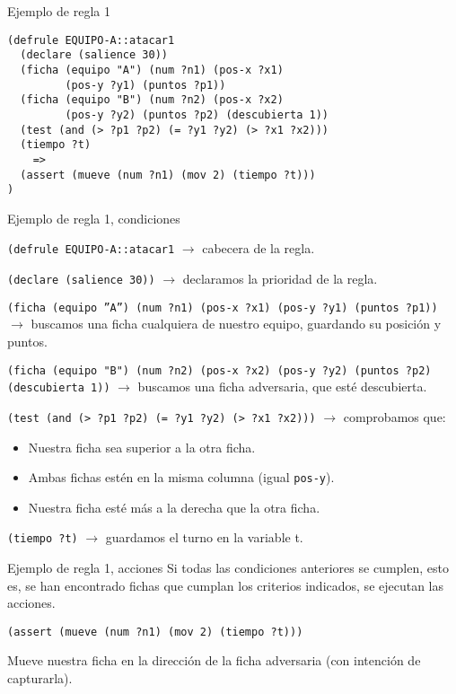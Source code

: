 \documentclass[smaller,spanish,xcolor=svgnames]{beamer}
\begin{document}
\begin{frame}[fragile]{Ejemplo de regla 1}
\begin{verbatim}
(defrule EQUIPO-A::atacar1
  (declare (salience 30))
  (ficha (equipo "A") (num ?n1) (pos-x ?x1)
         (pos-y ?y1) (puntos ?p1))
  (ficha (equipo "B") (num ?n2) (pos-x ?x2)
         (pos-y ?y2) (puntos ?p2) (descubierta 1))
  (test (and (> ?p1 ?p2) (= ?y1 ?y2) (> ?x1 ?x2)))
  (tiempo ?t)
    =>
  (assert (mueve (num ?n1) (mov 2) (tiempo ?t)))
)
\end{verbatim}
\end{frame}

\begin{frame}[fragile]{Ejemplo de regla 1, condiciones}

\small
\texttt{(defrule EQUIPO-A::atacar1} $\rightarrow$ cabecera de la regla.

\medskip

\texttt{(declare (salience 30))} $\rightarrow$ declaramos la prioridad de la regla.

\medskip

\texttt{(ficha (equipo ''A'') (num ?n1) (pos-x ?x1) (pos-y ?y1) (puntos ?p1))} $\rightarrow$ buscamos una ficha cualquiera de nuestro equipo, guardando su posición y puntos.

\medskip

\texttt{(ficha (equipo "B") (num ?n2) (pos-x ?x2) (pos-y ?y2) (puntos ?p2) (descubierta 1))} $\rightarrow$ buscamos una ficha adversaria, que esté descubierta.

\medskip

\texttt{(test (and (> ?p1 ?p2) (= ?y1 ?y2) (> ?x1 ?x2)))} $\rightarrow$ comprobamos que:
\begin{itemize}
\item Nuestra ficha sea superior a la otra ficha.
\item Ambas fichas estén en la misma columna (igual \texttt{pos-y}).
\item Nuestra ficha esté más a la derecha que la otra ficha.
\end{itemize}

\medskip

\texttt{(tiempo ?t)} $\rightarrow$ guardamos el turno en la variable t.
\end{frame}

\begin{frame}{Ejemplo de regla 1, acciones}
  Si todas las condiciones anteriores se cumplen, esto es, se han encontrado
  fichas que cumplan los criterios indicados, se ejecutan las acciones.

  \medskip

  \texttt{(assert (mueve (num ?n1) (mov 2) (tiempo ?t)))}

  \medskip

  Mueve nuestra ficha en la dirección de la ficha adversaria (con intención de capturarla).
\end{frame}
\end{document}
